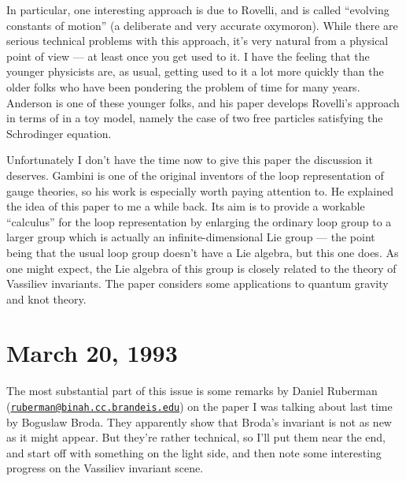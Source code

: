 \documentclass{article}
\def\tightlist{}
\renewcommand{\texttt}[1]{%
  \begingroup
  \ttfamily
  \begingroup\lccode`~=`/\lowercase{\endgroup\def~}{/\discretionary{}{}{}}%
  \begingroup\lccode`~=`[\lowercase{\endgroup\def~}{[\discretionary{}{}{}}%
  \begingroup\lccode`~=`.\lowercase{\endgroup\def~}{.\discretionary{}{}{}}%
  \catcode`/=\active\catcode`[=\active\catcode`.=\active
  \scantokens{#1\noexpand}%
  \endgroup
}
\begin{document}
In particular, one interesting approach is due to Rovelli, and is called
``evolving constants of motion'' (a deliberate and very accurate
oxymoron). While there are serious technical problems with this
approach, it's very natural from a physical point of view --- at least
once you get used to it. I have the feeling that the younger physicists
are, as usual, getting used to it a lot more quickly than the older
folks who have been pondering the problem of time for many years.
Anderson is one of these younger folks, and his paper develops Rovelli's
approach in terms of in a toy model, namely the case of two free
particles satisfying the Schrodinger equation.


Unfortunately I don't have the time now to give this paper the
discussion it deserves. Gambini is one of the original inventors of the
loop representation of gauge theories, so his work is especially worth
paying attention to. He explained the idea of this paper to me a while
back. Its aim is to provide a workable ``calculus'' for the loop
representation by enlarging the ordinary loop group to a larger group
which is actually an infinite-dimensional Lie group --- the point being
that the usual loop group doesn't have a Lie algebra, but this one does.
As one might expect, the Lie algebra of this group is closely related to
the theory of Vassiliev invariants. The paper considers some
applications to quantum gravity and knot theory.
\hypertarget{week10}{%
\section{March 20, 1993}\label{week10}}

The most substantial part of this issue is some remarks by Daniel
Ruberman
(\href{mailto:ruberman@binah.cc.brandeis.edu}{\nolinkurl{ruberman@binah.cc.brandeis.edu}})
on the paper I was talking about last time by Boguslaw Broda. They
apparently show that Broda's invariant is not as new as it might appear.
But they're rather technical, so I'll put them near the end, and start
off with something on the light side, and then note some interesting
progress on the Vassiliev invariant scene.
\end{document}
